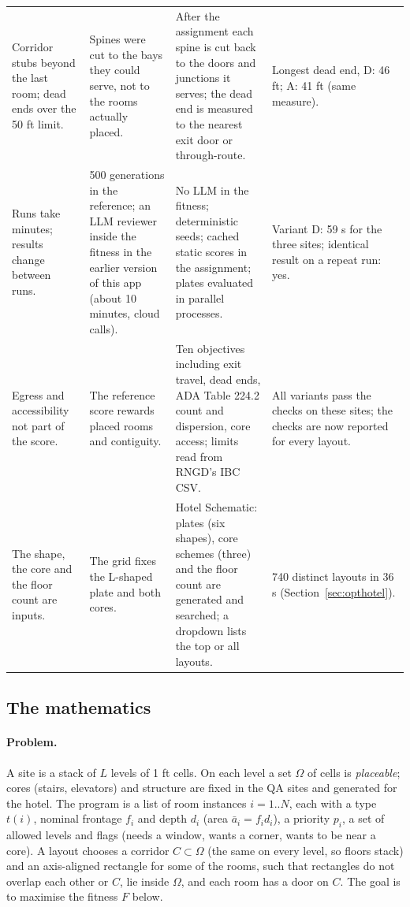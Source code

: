 \documentclass[10pt]{article}
\begin{document}
{\begin{longtable}{p{3.3cm}p{3.7cm}p{4.9cm}p{3.6cm}}
Corridor stubs beyond the last room; dead ends over the 50 ft limit. & Spines were cut to the bays they could serve, not to the rooms actually placed. & After the assignment each spine is cut back to the doors and junctions it serves; the dead end is measured to the nearest exit door or through-route. & Longest dead end, D: 46 ft; A: 41 ft (same measure). \\
Runs take minutes; results change between runs. & 500 generations in the reference; an LLM reviewer inside the fitness in the earlier version of this app (about 10 minutes, cloud calls). & No LLM in the fitness; deterministic seeds; cached static scores in the assignment; plates evaluated in parallel processes. & Variant D: 59 s for the three sites; identical result on a repeat run: yes. \\
Egress and accessibility not part of the score. & The reference score rewards placed rooms and contiguity. & Ten objectives including exit travel, dead ends, ADA Table 224.2 count and dispersion, core access; limits read from RNGD's IBC CSV. & All variants pass the checks on these sites; the checks are now reported for every layout. \\
The shape, the core and the floor count are inputs. & The grid fixes the L-shaped plate and both cores. & Hotel Schematic: plates (six shapes), core schemes (three) and the floor count are generated and searched; a dropdown lists the top or all layouts. & 740 distinct layouts in 36 s (Section~\ref{sec:opthotel}). \\
\bottomrule
\end{longtable}}


\subsection{The mathematics}
\label{sec:optmath}
\paragraph{Problem.} A site is a stack of $L$ levels of 1 ft cells. On each level a set $\Omega$ of cells is
\emph{placeable}; cores (stairs, elevators) and structure are fixed in the QA sites and generated for the hotel. The program
is a list of room instances $i = 1..N$, each with a type $t(i)$, nominal frontage $f_i$ and depth $d_i$ (area
$\bar a_i = f_i d_i$), a priority $p_i$, a set of allowed levels and flags (needs a window, wants a corner, wants to be near a
core). A layout chooses a corridor $C \subset \Omega$ (the same on every level, so floors stack) and an axis-aligned rectangle
for some of the rooms, such that rectangles do not overlap each other or $C$, lie inside $\Omega$, and each room has a door on
$C$. The goal is to maximise the fitness $F$ below.
\end{document}
